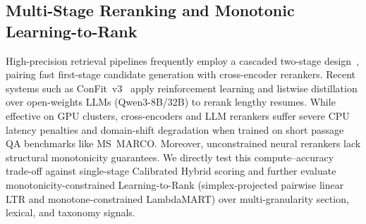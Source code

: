 \subsection{Multi-Stage Reranking and Monotonic Learning-to-Rank}
High-precision retrieval pipelines frequently employ a cascaded two-stage design~\cite{asadi2013effectiveness,nogueira2019passage}, pairing fast first-stage candidate generation with cross-encoder rerankers. Recent systems such as ConFit~v3~\cite{jasonyux2026confitv3} apply reinforcement learning and listwise distillation over open-weights LLMs (Qwen3-8B/32B) to rerank lengthy resumes. While effective on GPU clusters, cross-encoders and LLM rerankers suffer severe CPU latency penalties and domain-shift degradation when trained on short passage QA benchmarks like MS~MARCO. Moreover, unconstrained neural rerankers lack structural monotonicity guarantees. We directly test this compute--accuracy trade-off against single-stage Calibrated Hybrid scoring and further evaluate monotonicity-constrained Learning-to-Rank (simplex-projected pairwise linear LTR and monotone-constrained LambdaMART) over multi-granularity section, lexical, and taxonomy signals.
